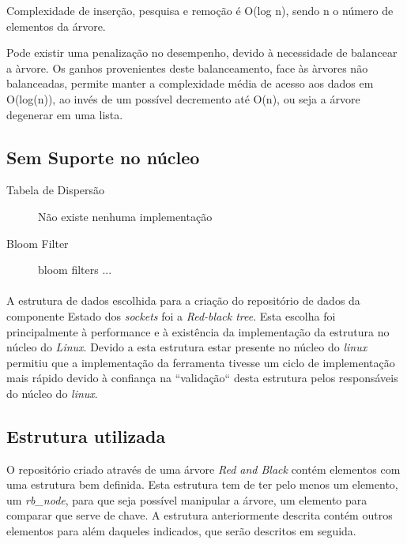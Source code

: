 \begin{description}
Complexidade de inserção, pesquisa e remoção é O(log n), sendo n o número de elementos da árvore.

Pode existir uma penalização no desempenho, devido à necessidade de balancear a àrvore.
Os ganhos provenientes deste balanceamento, face às àrvores não balanceadas, permite manter a complexidade média de acesso aos dados em O(log(n)), ao invés de um possível decremento até O(n), ou seja a árvore degenerar em uma lista.
\end{description}

\subsection{Sem Suporte no núcleo}

\begin{description}
\item[Tabela de Dispersão]
Não existe nenhuma implementação 

\item[Bloom Filter]
bloom filters ...

\end{description}
\paragraph*{}
A estrutura de dados escolhida para a criação do repositório de dados da componente Estado dos \textit{sockets} foi a \textit{Red-black tree}.
 Esta escolha foi principalmente à performance e à existência da implementação da estrutura no núcleo do \textit{Linux}.
 Devido a esta estrutura estar presente no núcleo do \textit{linux} permitiu que a implementação da ferramenta tivesse um ciclo de implementação mais rápido devido à confiança na ``validação`` desta estrutura pelos responsáveis do núcleo do \textit{linux}.
 
\subsection{Estrutura utilizada}
\label{sub:repo_structure}

O repositório criado através de uma árvore \textit{Red and Black} contém elementos com uma estrutura bem definida.
Esta estrutura tem de ter pelo menos um elemento, um \textit{rb\_node}, para que seja possível manipular a árvore, um elemento para comparar que serve de chave.
A estrutura anteriormente descrita contém outros elementos para além daqueles indicados, que serão descritos em seguida.

